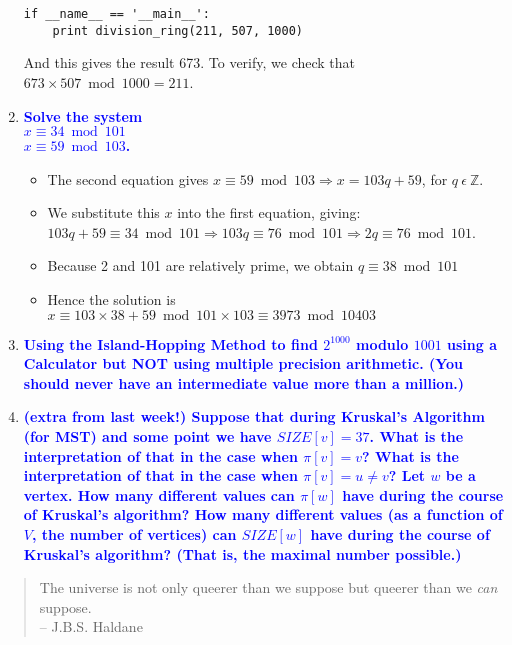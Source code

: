 \documentclass[11pt]{article}
\begin{document}
\begin{enumerate}
\begin{verbatim}
if __name__ == '__main__':
    print division_ring(211, 507, 1000)
    \end{verbatim}
    And this gives the result 673. To verify, we check that $673 \times 507 \bmod 1000 = 211$.
    

\item \textbf{\textcolor{blue}{Solve the system \\ $x\equiv 34 \bmod{101}$\\ $x\equiv 59 \bmod{103}$.}}
    \begin{itemize}
        \item The second equation gives $x \equiv 59 \bmod{103} \Rightarrow x = 103q + 59$, for $q\ \epsilon\ \mathbb{Z}$.
        \item We substitute this $x$ into the first equation, giving: $103q + 59 \equiv 34 \bmod{101} \Rightarrow 103q \equiv 76 \bmod{101} \Rightarrow 2q \equiv 76 \bmod{101}$.
        \item Because 2 and 101 are relatively prime, we obtain $q \equiv 38 \bmod{101}$
        \item Hence the solution is $x \equiv 103 \times 38 + 59 \bmod{101 \times 103} \equiv 3973 \bmod{10403}$
    \end{itemize}

\item \textbf{\textcolor{blue}{Using the Island-Hopping Method to find $2^{1000}$ modulo $1001$ using a Calculator but NOT using multiple precision arithmetic. (You should never have an intermediate value more than a million.)}}

\item \textbf{\textcolor{blue}{(extra from last week!) Suppose that during Kruskal's Algorithm (for MST) and some point we have $SIZE[v]=37$. What is the interpretation of that in the case when $\pi[v]=v$? What is the interpretation
of that in the case when $\pi[v]=u\neq v$? Let $w$ be a vertex. How many different values can $\pi[w]$ have during the course of Kruskal's algorithm? How many different values (as a function of $V$, the number of vertices) can $SIZE[w]$ have during the course of Kruskal's algorithm? (That is, the maximal number possible.)}}

\end{enumerate}

\begin{quote}
The universe is not only queerer than we suppose but queerer than we {\em can}
suppose.  \\ -- J.B.S. Haldane
\end{quote}
\end{document}
